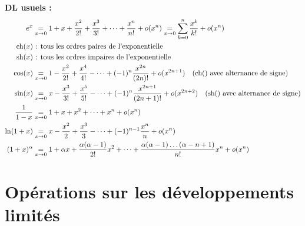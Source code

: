 \textbf{DL usuels :}
\begin{align*}
    e^x &\underset{x \rightarrow 0}{=} 1 + x + \dfrac{x^2}{2!} + \dfrac{x^3}{3!} + \dots + \dfrac{x^n}{n!} + o(x^n) \underset{x \rightarrow 0}{=} \sum_{k=0}^n \frac{x^k}{k!} + o(x^n)\\
    \operatorname{ch}(x) &\textrm{ : tous les ordres paires de l'exponentielle}\\
    \operatorname{sh}(x) & \textrm{ : tous les ordres impaires de l'exponentielle}\\
    \cos(x) &\underset{x \rightarrow 0}{=} 1 - \dfrac{x^2}{2!} + \dfrac{x^4}{4!} - \dots + (-1)^n \dfrac{x^{2n}}{(2n)!} + o(x^{2n+1}) \quad \textrm{(ch() avec alternance de signe)}\\
    \sin(x) &\underset{x \rightarrow 0}{=} x - \dfrac{x^3}{3!} + \dfrac{x^5}{5!} - \dots + (-1)^n \dfrac{x^{2n+1}}{(2n+1)!} + o(x^{2n+2}) \quad \textrm{(sh() avec alternance de signe)}\\
    \dfrac{1}{1 - x} &\underset{x \rightarrow 0}{=} 1 + x + x^2 + \dots + x^n + o(x^n)\\
    \ln(1 + x) &\underset{x \rightarrow 0}{=} x - \dfrac{x^2}{2} + \dfrac{x^3}{3} - \dots + (-1)^{n-1} \dfrac{x^n}{n} + o(x^n)\\
    (1+x)^\alpha &\underset{x \rightarrow 0}{=} 1 + \alpha x + \dfrac{\alpha(\alpha-1)}{2!} x^2 + \dots + \dfrac{\alpha(\alpha-1)\dots(\alpha-n+1)}{n!} x^n + o(x^n)\\
\end{align*}

\section{Opérations sur les développements limités}







